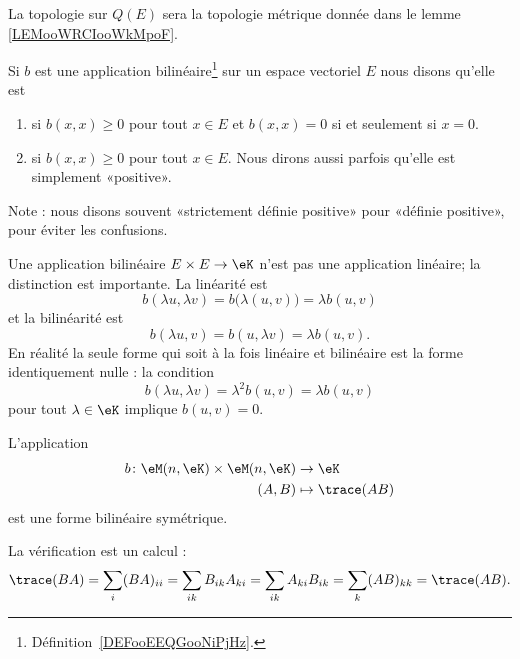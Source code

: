 La topologie sur \( Q(E)\) sera la topologie métrique donnée dans le lemme \ref{LEMooWRCIooWkMpoF}.

\begin{definition}      \label{DEFooJIAQooZkBtTy}
	Si \( b\) est une application bilinéaire\footnote{Définition~\ref{DEFooEEQGooNiPjHz}.} sur un espace vectoriel \( E\) nous disons qu'elle est
	\begin{enumerate}
		\item		\label{ITEMooRVGDooQmNqyg}
		       si \( b(x,x)\geq 0\) pour tout \( x\in E\) et \( b(x,x)=0\) si et seulement si \( x=0\).
		\item
		       si \( b(x,x)\geq 0\) pour tout \( x\in E\). Nous dirons aussi parfois qu'elle est simplement «positive».
	\end{enumerate}
	Note : nous disons souvent «strictement définie positive» pour «définie positive», pour éviter les confusions.
\end{definition}

\begin{normaltext}
	Une application bilinéaire \( E\times E\to \eK\) n'est pas une application linéaire; la distinction est importante. La linéarité est
	\begin{equation}
		b(\lambda u,\lambda v)= b\big( \lambda(u,v) \big)=\lambda b(u,v)
	\end{equation}
	et la bilinéarité est
	\begin{equation}
		b(\lambda u,v)=b(u,\lambda v)=\lambda b(u,v).
	\end{equation}
	En réalité la seule forme qui soit à la fois linéaire et bilinéaire est la forme identiquement nulle : la condition
	\begin{equation}
		b(\lambda u,\lambda v)=\lambda^2b(u,v)=\lambda b(u,v)
	\end{equation}
	pour tout \( \lambda\in \eK\) implique \( b(u,v)=0\).
\end{normaltext}

\begin{example}       \label{EXooKFBOooJjXZwu}
	L'application
	\begin{equation}
		\begin{aligned}
			b\colon \eM(n,\eK)\times \eM(n,\eK) & \to \eK            \\
			(A,B)                               & \mapsto \trace(AB)
		\end{aligned}
	\end{equation}
	est une forme bilinéaire symétrique.

	La vérification est un calcul :
	\begin{equation}
		\trace(BA)=\sum_{i}(BA)_{ii}=\sum_{ik}B_{ik}A_{ki}=\sum_{ik}A_{ki}B_{ik}=\sum_k(AB)_{kk}=\trace(AB).
	\end{equation}
\end{example}

